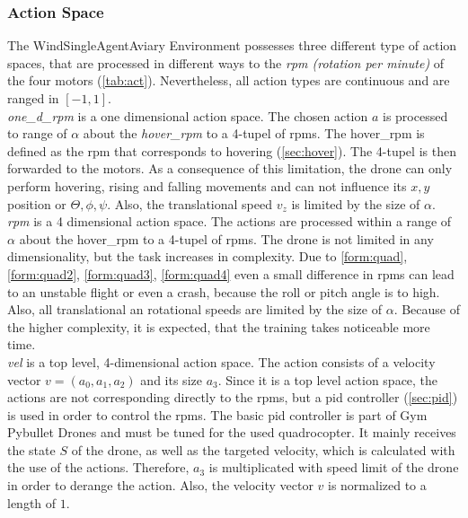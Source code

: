 \subsubsection{Action Space}
The WindSingleAgentAviary Environment possesses three different type of action spaces, that are processed in different ways to the \emph{rpm (rotation per minute)} of the four motors (\cref{tab:act}). Nevertheless, all action types are continuous and are ranged in $[-1, 1]$.\\
\newline
\emph{one\_d\_rpm} is a one dimensional action space. The chosen action $a$ is processed to range of $\alpha$ about the \emph{hover\_rpm} to a 4-tupel of rpms. The hover\_rpm is defined as the rpm that corresponds to hovering (\cref{sec:hover}). The 4-tupel is then forwarded to the motors. As a consequence of this limitation, the drone can only perform hovering, rising and falling movements and can not influence its $x,y$ position or $\Theta, \phi, \psi$. Also, the translational speed $v_z$ is limited by the size of $\alpha$.\\
\newline
\emph{rpm} is a 4 dimensional action space. The actions are processed within a range of $\alpha$ about the hover\_rpm to a 4-tupel of rpms. The drone is not limited in any dimensionality, but the task increases in complexity. Due to \cref{form:quad}, \cref{form:quad2}, \cref{form:quad3}, \cref{form:quad4} even a small difference in rpms can lead to an unstable flight or even a crash, because the roll or pitch angle is to high. Also, all translational an rotational speeds are limited by the size of $\alpha$. Because of the higher complexity, it is expected, that the training takes noticeable more time.\\
\newline
\emph{vel} is a top level, 4-dimensional action space. The action consists of a velocity vector $v = (a_0, a_1, a_2)$ and its size $a_3$.  Since it is a top level action space, the actions are not corresponding directly to the rpms, but a pid controller (\cref{sec:pid}) is used in order to control the rpms. The basic pid controller is part of Gym Pybullet Drones \cite{panerati2021learning} and must be tuned for the used quadrocopter. It mainly receives the state $S$ of the drone, as well as the targeted velocity, which is calculated with the use of the actions. Therefore, $a_3$ is multiplicated with speed limit of the drone in order to derange the action. Also, the velocity vector $v$ is normalized to a length of $1$.\\
